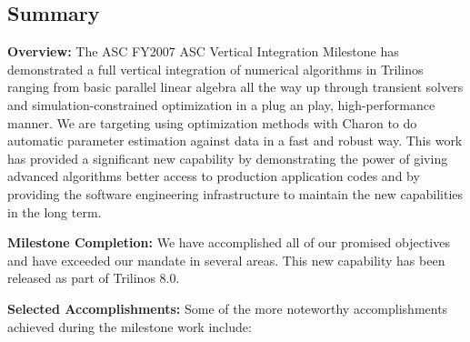 \documentclass[pdf,ps2pdf,11pt]{SANDreport}
\begin{document}
%
\cleardoublepage   %
\tableofcontents
\listoffigures
\listoftables



\clearpage

\subsection*{Summary}

%
%

{}\noindent\textbf{Overview:} The ASC FY2007 ASC Vertical Integration
Milestone has demonstrated a full vertical integration of numerical algorithms
in Trilinos ranging from basic parallel linear algebra all the way
up through transient solvers and simulation-constrained optimization in a plug
an play, high-performance manner.  We are targeting using optimization methods
with Charon to do automatic parameter estimation against data in a fast and
robust way.  This work has provided a significant new capability by
demonstrating the power of giving advanced algorithms better access to
production application codes and by providing the software engineering
infrastructure to maintain the new capabilities in the long term.

{}\noindent\textbf{Milestone Completion:} We have accomplished all of our
promised objectives and have exceeded our mandate in several areas.  This new
capability has been released as part of Trilinos 8.0.

{}\noindent\textbf{Selected Accomplishments:} Some of the more noteworthy
accomplishments achieved during the milestone work include:\\[0.5ex]
\end{document}
